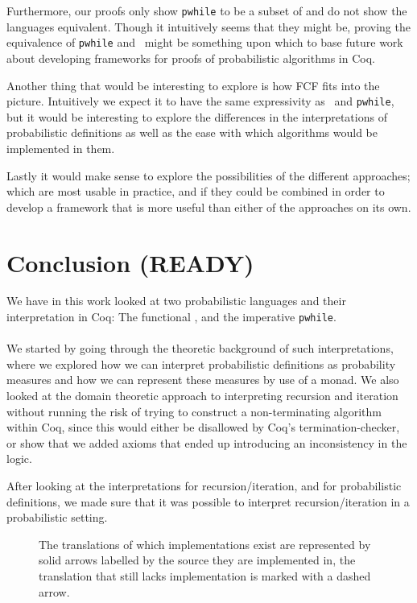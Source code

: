 \documentclass[11pt, leqno, titlepage]{article}
\theoremstyle{definition}
\begin{document}
Furthermore, our proofs only show \texttt{pwhile} to be a subset of \rml and do not
show the languages equivalent. Though it intuitively seems that they might be,
proving the equivalence of \texttt{pwhile} and \rml\ might be something upon which to
base future work about developing frameworks for proofs of probabilistic algorithms
in Coq.

Another thing that would be interesting to explore is how FCF fits into the
picture. Intuitively we expect it to have the same expressivity as \rml\ and
\texttt{pwhile}, but it would be interesting to explore the differences in the
interpretations of probabilistic definitions as well as the ease with which algorithms
would be implemented in them.

Lastly it would make sense to explore the possibilities of the different approaches;
which are most usable in practice, and if they could be combined in order to develop
a framework that is more useful than either of the approaches on its own. 

\section{Conclusion (READY)}
\label{sec:conclusion}
We have in this work looked at two probabilistic languages and their interpretation
in Coq: The functional \rml, and the imperative \texttt{pwhile}.\\
\\
We started by going through the theoretic background of such interpretations, where
we explored how we can interpret probabilistic definitions as probability measures
and how we can represent these measures by use of a monad. We also looked at the
domain theoretic approach to interpreting recursion and iteration without running the
risk of trying to construct a non-terminating algorithm within Coq, since this would
either be disallowed by Coq's termination-checker, or show that we added axioms
that ended up introducing an inconsistency in the logic.

After looking at the interpretations for recursion/iteration, and for probabilistic
definitions, we made sure that it was possible to interpret recursion/iteration in a
probabilistic setting.
\begin{figure}[h]
  \centering
  \caption{The translations of which implementations exist are represented by solid
    arrows labelled by the source they are implemented in, the translation that still
    lacks implementation is marked with a dashed arrow. }
  \label{fig:triangle-ours}
\end{figure}
\end{document}
